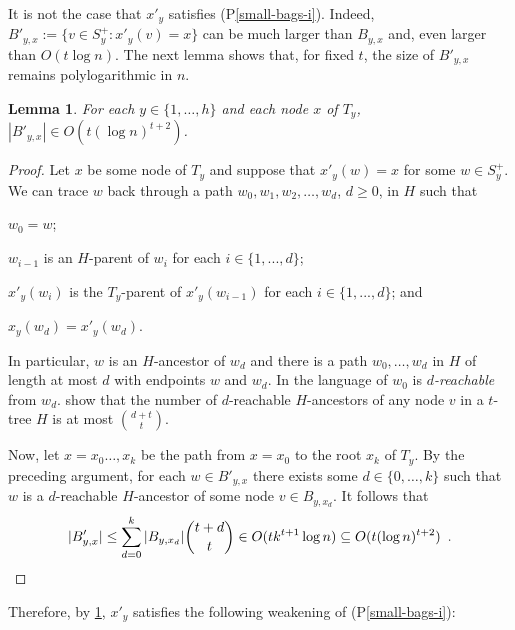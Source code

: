 \documentclass{patmorin}
\newcommand{\pref}[1]{(P\ref{#1})}
\newtheorem{lemma}{Lemma}
\begin{document}

It is not the case that $x'_y$ satisfies \pref{small-bags-i}.  Indeed, $B'_{y,x}:=\{v\in S^+_y: x'_y(v)=x\}$ can be much larger than $B_{y,x}$ and, even larger than $O(t\log n)$.  The next lemma shows that, for fixed $t$, the size of $B'_{y,x}$ remains polylogarithmic in $n$.

\begin{lemma}\label{small-bags-ii-lem}
    For each $y\in\{1,\ldots,h\}$ and each node $x$ of $T_y$, $|B'_{y,x}|\in O(t(\log n)^{t+2})$.
\end{lemma}

\begin{proof}
    Let $x$ be some node of $T_y$ and suppose that $x'_y(w)=x$ for some $w\in S^+_y$.  We can trace $w$ back through a path $w_0,w_1,w_2,\ldots,w_d$, $d\ge 0$, in $H$ such that
    \begin{compactenum}[(a)]
        \item $w_0=w$;
        \item $w_{i-1}$ is an $H$-parent of $w_i$ for each $i\in\{1,...,d\}$;
        \item $x'_y(w_{i})$ is the $T_y$-parent of $x'_y(w_{i-1})$ for each $i\in\{1,...,d\}$; and
        \item $x_y(w_d)=x'_y(w_d)$.
    \end{compactenum}
    In particular, $w$ is an $H$-ancestor of $w_d$ and there is a path $w_0,\ldots,w_d$ in $H$ of length at most $d$ with endpoints $w$ and $w_d$.  In the language of \citet{pilipczuk.siebertz:polynomial} $w_0$ is \emph{$d$-reachable} from $w_d$.  \citet[Lemma~13]{pilipczuk.siebertz:polynomial-arxiv} show that the number of $d$-reachable $H$-ancestors of any node $v$ in a $t$-tree $H$ is at most $\binom{d+t}{t}$.

    Now, let $x=x_0\ldots,x_k$ be the path from $x=x_0$ to the root $x_k$ of $T_y$. By the preceding argument, for each $w\in B'_{y,x}$ there exists some $d\in\{0,\ldots,k\}$ such that $w$ is a $d$-reachable $H$-ancestor of some node $v\in B_{y,x_d}$.  It follows that
    \[
        |B'_{y,x}|
            \le \sum_{d=0}^k |B_{y,x_d}|\binom{t+d}{t}
            \in O(tk^{t+1}\log n)
            \subseteq O(t(\log n)^{t+2}) \enspace . \qedhere
    \]
\end{proof}

Therefore, by \cref{small-bags-ii-lem}, $x'_y$ satisfies the following weakening of \pref{small-bags-i}:
\end{document}
